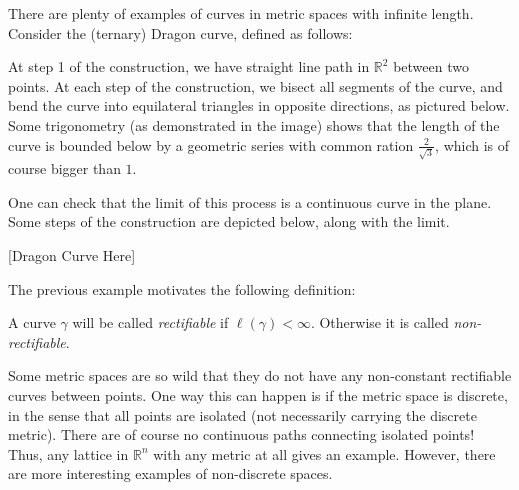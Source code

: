 \documentclass[12pt]{amsart}
\begin{document}

\begin{example}
There are plenty of examples of curves in metric spaces with infinite length. Consider the (ternary) Dragon curve, defined as follows:

At step 1 of the construction, we have  straight line path in $\mathbb{R}^2$ between two points. At each step of the construction, we bisect all segments of the curve, and bend the curve into equilateral triangles in opposite directions, as pictured below. Some trigonometry (as demonstrated in the image) shows that the length of the curve is bounded below by a geometric series with common ration $\frac{2}{\sqrt{3}}$, which is of course bigger than $1$.

One can check that the limit of this process is a continuous curve in the plane. Some steps of the construction are depicted below, along with the limit.

\end{example}

\begin{center}

[Dragon Curve Here]

\end{center}

The previous example motivates the following definition:

\begin{definition} A curve $\gamma$ will be called \textit{rectifiable} if $\ell (\gamma) < \infty$. Otherwise it is called \textit{non-rectifiable}.

\end{definition}

Some metric spaces are so wild that they do not have any non-constant rectifiable curves between points. One way this can happen is if the metric space is discrete, in the sense that all points are isolated (not necessarily carrying the discrete metric). There are of course no continuous paths connecting isolated points! Thus, any lattice in $\mathbb{R}^n$ with any metric at all gives an example. However, there are more interesting examples of non-discrete spaces.
\end{document}
